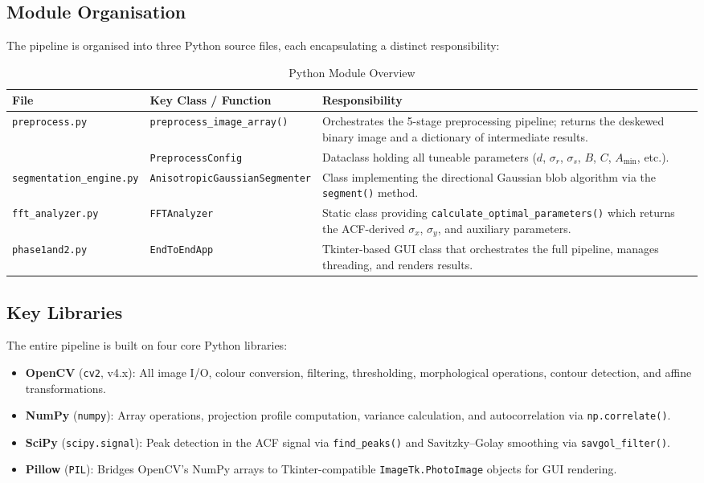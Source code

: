 \documentclass[12pt, a4paper]{article}
\begin{document}
\subsection{Module Organisation}

The pipeline is organised into three Python source files, each encapsulating a distinct responsibility:

\begin{table}[H]
\centering
\caption{Python Module Overview}
\label{tab:modules}
\begin{tabular}{@{}llp{6.5cm}@{}}
\toprule
\textbf{File} & \textbf{Key Class / Function} & \textbf{Responsibility} \\
\midrule
\texttt{preprocess.py} & \texttt{preprocess\_image\_array()} & Orchestrates the 5-stage preprocessing pipeline; returns the deskewed binary image and a dictionary of intermediate results. \\
 & \texttt{PreprocessConfig} & Dataclass holding all tuneable parameters ($d$, $\sigma_r$, $\sigma_s$, $B$, $C$, $A_{\min}$, etc.). \\
\midrule
\texttt{segmentation\_engine.py} & \texttt{AnisotropicGaussianSegmenter} & Class implementing the directional Gaussian blob algorithm via the \texttt{segment()} method. \\
\midrule
\texttt{fft\_analyzer.py} & \texttt{FFTAnalyzer} & Static class providing \texttt{calculate\_optimal\_parameters()} which returns the ACF-derived $\sigma_x$, $\sigma_y$, and auxiliary parameters. \\
\midrule
\texttt{phase1and2.py} & \texttt{EndToEndApp} & Tkinter-based GUI class that orchestrates the full pipeline, manages threading, and renders results. \\
\bottomrule
\end{tabular}
\end{table}

\subsection{Key Libraries}

The entire pipeline is built on four core Python libraries:

\begin{itemize}
    \item \textbf{OpenCV} (\texttt{cv2}, v4.x): All image I/O, colour conversion, filtering, thresholding, morphological operations, contour detection, and affine transformations.
    \item \textbf{NumPy} (\texttt{numpy}): Array operations, projection profile computation, variance calculation, and autocorrelation via \texttt{np.correlate()}.
    \item \textbf{SciPy} (\texttt{scipy.signal}): Peak detection in the ACF signal via \texttt{find\_peaks()} and Savitzky--Golay smoothing via \texttt{savgol\_filter()}.
    \item \textbf{Pillow} (\texttt{PIL}): Bridges OpenCV's NumPy arrays to Tkinter-compatible \texttt{ImageTk.PhotoImage} objects for GUI rendering.
\end{itemize}
\end{document}
